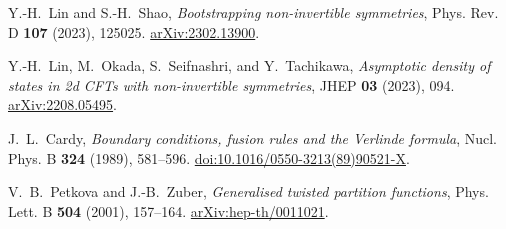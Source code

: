 Y.-H.~Lin and S.-H.~Shao,
\emph{Bootstrapping non-invertible symmetries},
Phys. Rev. D \textbf{107} (2023), 125025.
\href{https://arxiv.org/abs/2302.13900}{arXiv:2302.13900}.

Y.-H.~Lin, M.~Okada, S.~Seifnashri, and Y.~Tachikawa,
\emph{Asymptotic density of states in 2d CFTs with non-invertible symmetries},
JHEP \textbf{03} (2023), 094.
\href{https://arxiv.org/abs/2208.05495}{arXiv:2208.05495}.

J.~L.~Cardy,
\emph{Boundary conditions, fusion rules and the Verlinde formula},
Nucl. Phys. B \textbf{324} (1989), 581--596.
\href{https://doi.org/10.1016/0550-3213(89)90521-X}{doi:10.1016/0550-3213(89)90521-X}.

V.~B.~Petkova and J.-B.~Zuber,
\emph{Generalised twisted partition functions},
Phys. Lett. B \textbf{504} (2001), 157--164.
\href{https://arxiv.org/abs/hep-th/0011021}{arXiv:hep-th/0011021}.
